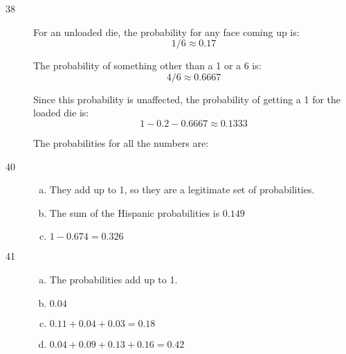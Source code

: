 \documentclass[letterpaper, landscape]{exam}
\begin{document}
\begin{description}
      \item[38]
        For an unloaded die, the probability for any face coming up is:
        \[
          1/6 \approx 0.17
        \]

        The probability of something other than a 1 or a 6 is:
        \[
          4/6 \approx 0.6667
        \]

        Since this probability is unaffected, the probability of getting a 1 for
        the loaded die is:
        \[
          1 - 0.2 - 0.6667 \approx 0.1333
        \]

        The probabilities for all the numbers are:


      \newpage

      \item[40]
        \begin{enumerate}[(a)]
          \item They add up to 1, so they are a legitimate set of probabilities.

          \item The sum of the Hispanic probabilities is $\boxed{ 0.149 }$

          \item $1 - 0.674 = \boxed{ 0.326 }$
        \end{enumerate}

      \item[41]
        \begin{enumerate}[(a)]
          \item The probabilities add up to 1.

          \item $\boxed{ 0.04 }$

          \item $0.11 + 0.04 + 0.03 = \boxed{ 0.18 }$

          \item $0.04 + 0.09 + 0.13 + 0.16 = \boxed{ 0.42 }$


\end{enumerate}
\end{description}
\end{document}
